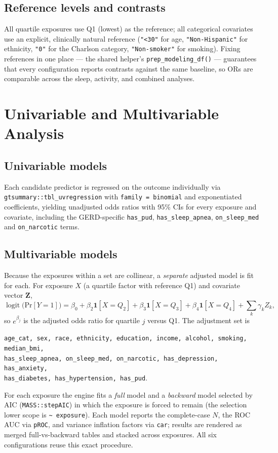 \documentclass[11pt]{article}
\DeclareMathOperator{\logit}{logit}
\newcommand{\ind}{\mathbf{1}}}
\providecommand{\Pr}{\mathrm{Pr}}
\newcommand{\code}[1]{\texttt{\small #1}}
\begin{document}
\subsection{Reference levels and contrasts}
All quartile exposures use Q1 (lowest) as the reference; all categorical covariates use an explicit,
clinically natural reference (\code{"<30"} for age, \code{"Non-Hispanic"} for ethnicity, \code{"0"} for
the Charlson category, \code{"Non-smoker"} for smoking). Fixing references in one place --- the shared
helper's \code{prep_modeling_df()} --- guarantees that every configuration reports contrasts against the
same baseline, so ORs are comparable across the sleep, activity, and combined analyses.

\section{Univariable and Multivariable Analysis}

\subsection{Univariable models}
Each candidate predictor is regressed on the outcome individually via
\code{gtsummary::tbl_uvregression} with \code{family = binomial} and exponentiated coefficients,
yielding unadjusted odds ratios with 95\% CIs for every exposure and covariate, including the
GERD-specific \code{has_pud}, \code{has_sleep_apnea}, \code{on_sleep_med} and \code{on_narcotic}
terms.

\subsection{Multivariable models}
Because the exposures within a set are collinear, a \emph{separate} adjusted model is fit for each. For
exposure $X$ (a quartile factor with reference Q1) and covariate vector $\mathbf{Z}$,
\[
\logit\!\big(\Pr[Y=1]\big) = \beta_0 + \beta_2 \ind[X{=}Q_2] + \beta_3 \ind[X{=}Q_3]
+ \beta_4 \ind[X{=}Q_4] + \sum_{k} \gamma_k Z_k ,
\]
so $e^{\beta_j}$ is the adjusted odds ratio for quartile $j$ versus Q1. The adjustment set is
\begin{center}
\code{age_cat, sex, race, ethnicity, education, income, alcohol, smoking, median_bmi,}\\
\code{has_sleep_apnea, on_sleep_med, on_narcotic, has_depression, has_anxiety,}\\
\code{has_diabetes, has_hypertension, has_pud}.
\end{center}
For each exposure the engine fits a \emph{full} model and a \emph{backward} model selected by AIC
(\code{MASS::stepAIC}) in which the exposure is forced to remain (the selection lower scope is
\code{\textasciitilde{} exposure}). Each model reports the complete-case $N$, the ROC AUC via
\code{pROC}, and variance inflation factors via \code{car}; results are rendered as merged
full-vs-backward tables and stacked across exposures. All six configurations reuse this exact procedure.
\end{document}
